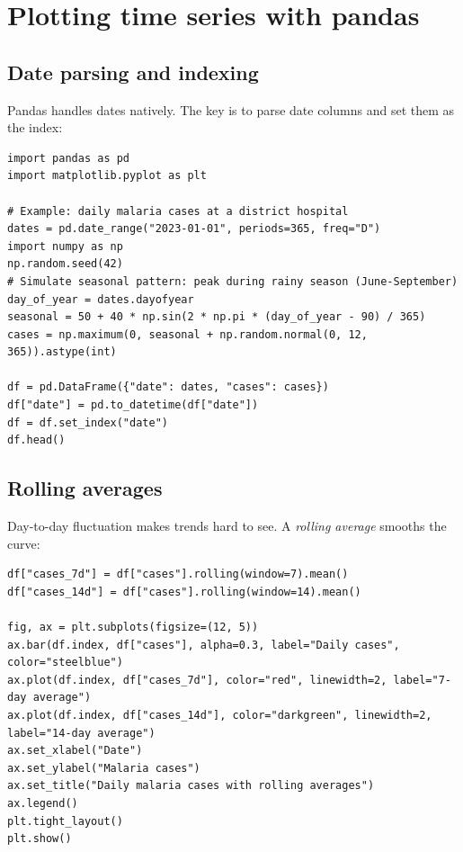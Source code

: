 \section{Plotting time series with pandas}

\subsection{Date parsing and indexing}

Pandas handles dates natively. The key is to parse date columns and set them as the index:

\begin{verbatim}
import pandas as pd
import matplotlib.pyplot as plt

# Example: daily malaria cases at a district hospital
dates = pd.date_range("2023-01-01", periods=365, freq="D")
import numpy as np
np.random.seed(42)
# Simulate seasonal pattern: peak during rainy season (June-September)
day_of_year = dates.dayofyear
seasonal = 50 + 40 * np.sin(2 * np.pi * (day_of_year - 90) / 365)
cases = np.maximum(0, seasonal + np.random.normal(0, 12, 365)).astype(int)

df = pd.DataFrame({"date": dates, "cases": cases})
df["date"] = pd.to_datetime(df["date"])
df = df.set_index("date")
df.head()
\end{verbatim}

\subsection{Rolling averages}

Day-to-day fluctuation makes trends hard to see. A \emph{rolling average} smooths the curve:

\begin{verbatim}
df["cases_7d"] = df["cases"].rolling(window=7).mean()
df["cases_14d"] = df["cases"].rolling(window=14).mean()

fig, ax = plt.subplots(figsize=(12, 5))
ax.bar(df.index, df["cases"], alpha=0.3, label="Daily cases", color="steelblue")
ax.plot(df.index, df["cases_7d"], color="red", linewidth=2, label="7-day average")
ax.plot(df.index, df["cases_14d"], color="darkgreen", linewidth=2, label="14-day average")
ax.set_xlabel("Date")
ax.set_ylabel("Malaria cases")
ax.set_title("Daily malaria cases with rolling averages")
ax.legend()
plt.tight_layout()
plt.show()
\end{verbatim}

